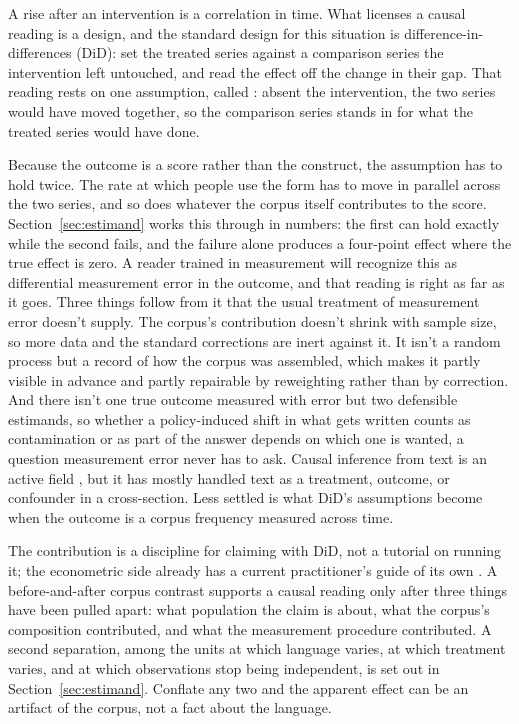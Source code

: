 A rise after an intervention is a correlation in time. What licenses a causal reading is a design, and the standard design for this situation is difference-in-differences (DiD): set the treated series against a comparison series the intervention left untouched, and read the effect off the change in their gap. That reading rests on one assumption, called : absent the intervention, the two series would have moved together, so the comparison series stands in for what the treated series would have done.

Because the outcome is a score rather than the construct, the assumption has to hold twice. The rate at which people use the form has to move in parallel across the two series, and so does whatever the corpus itself contributes to the score. Section~\ref{sec:estimand} works this through in numbers: the first can hold exactly while the second fails, and the failure alone produces a four-point effect where the true effect is zero. A reader trained in measurement will recognize this as differential measurement error in the outcome, and that reading is right as far as it goes. Three things follow from it that the usual treatment of measurement error doesn't supply. The corpus's contribution doesn't shrink with sample size, so more data and the standard corrections are inert against it. It isn't a random process but a record of how the corpus was assembled, which makes it partly visible in advance and partly repairable by reweighting rather than by correction. And there isn't one true outcome measured with error but two defensible estimands, so whether a policy-induced shift in what gets written counts as contamination or as part of the answer depends on which one is wanted, a question measurement error never has to ask. Causal inference from text is an active field \citep{keith2020text,grimmer2022text,egami2022texts}, but it has mostly handled text as a treatment, outcome, or confounder in a cross-section. Less settled is what DiD's assumptions become when the outcome is a corpus frequency measured across time.

The contribution is a discipline for claiming with DiD, not a tutorial on running it; the econometric side already has a current practitioner's guide of its own \citep{BakerEtAl2026}. A before-and-after corpus contrast supports a causal reading only after three things have been pulled apart: what population the claim is about, what the corpus's composition contributed, and what the measurement procedure contributed. A second separation, among the units at which language varies, at which treatment varies, and at which observations stop being independent, is set out in Section~\ref{sec:estimand}. Conflate any two and the apparent effect can be an artifact of the corpus, not a fact about the language.

